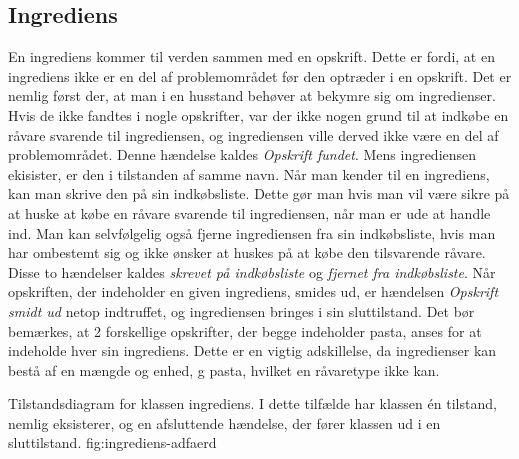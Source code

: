 \subsection{Ingrediens}

En ingrediens kommer til verden sammen med en opskrift. Dette er fordi, at en ingrediens ikke er en del af problemområdet før den optræder i en opskrift. Det er nemlig først der, at man i en husstand behøver at bekymre sig om ingredienser. Hvis de ikke fandtes i nogle opskrifter, var der ikke nogen grund til at indkøbe en råvare svarende til ingrediensen, og ingrediensen ville derved ikke være en del af problemområdet. Denne hændelse kaldes \textit{Opskrift fundet}. Mens ingrediensen ekisister, er den i tilstanden af samme navn. Når man kender til en ingrediens, kan man skrive den på sin indkøbsliste. Dette gør man hvis man vil være sikre på at huske at købe en råvare svarende til ingrediensen, når man er ude at handle ind. Man kan selvfølgelig også fjerne ingrediensen fra sin indkøbsliste, hvis man har ombestemt sig og ikke ønsker at huskes på at købe den tilsvarende råvare. Disse to hændelser kaldes \textit{skrevet på indkøbsliste} og \textit{fjernet fra indkøbsliste}. Når opskriften, der indeholder en given ingrediens, smides ud, er hændelsen \textit{Opskrift smidt ud} netop indtruffet, og ingrediensen bringes i sin sluttilstand. Det bør bemærkes, at 2 forskellige opskrifter, der begge indeholder pasta, anses for at indeholde hver sin ingrediens. Dette er en vigtig adskillelse, da ingredienser kan bestå af en mængde og enhed,  g pasta, hvilket en råvaretype ikke kan.

  {Tilstandsdiagram for klassen ingrediens. I dette tilfælde har klassen én tilstand, nemlig eksisterer, og en afsluttende hændelse, der fører klassen ud i en sluttilstand.}
  {fig:ingrediens-adfaerd}
